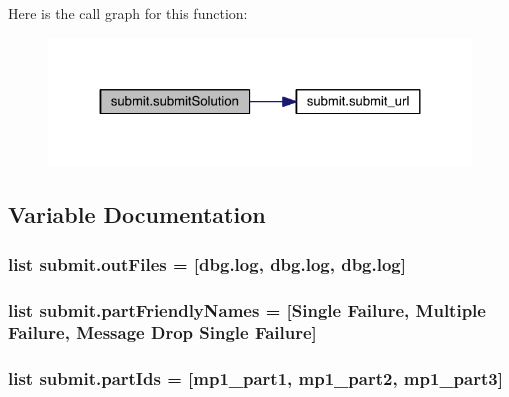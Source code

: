 Here is the call graph for this function\+:\nopagebreak
\begin{figure}[H]
\begin{center}
\leavevmode
\includegraphics[width=324pt]{df/d89/namespacesubmit_a60851498bd1a010849ce5eea631d5db4_cgraph}
\end{center}
\end{figure}




\subsection{Variable Documentation}
\hypertarget{namespacesubmit_a3786c6934dacbb2bfc06016782e0762a}{}
\subsubsection[{out\+Files}]{\setlength{\rightskip}{0pt plus 5cm}list submit.\+out\+Files = \mbox{[}\textquotesingle{}dbg.\+log\textquotesingle{}, \textquotesingle{}dbg.\+log\textquotesingle{}, \textquotesingle{}dbg.\+log\textquotesingle{}\mbox{]}}\label{namespacesubmit_a3786c6934dacbb2bfc06016782e0762a}
\hypertarget{namespacesubmit_aeb3f352aa22c52014fd7d466e68fd0c9}{}
\subsubsection[{part\+Friendly\+Names}]{\setlength{\rightskip}{0pt plus 5cm}list submit.\+part\+Friendly\+Names = \mbox{[}\textquotesingle{}Single Failure\textquotesingle{}, \textquotesingle{}Multiple Failure\textquotesingle{}, \textquotesingle{}Message Drop Single Failure\textquotesingle{}\mbox{]}}\label{namespacesubmit_aeb3f352aa22c52014fd7d466e68fd0c9}
\hypertarget{namespacesubmit_adcc18b8607b8217f0065424b10a8d0bb}{}
\subsubsection[{part\+Ids}]{\setlength{\rightskip}{0pt plus 5cm}list submit.\+part\+Ids = \mbox{[}\textquotesingle{}mp1\+\_\+part1\textquotesingle{}, \textquotesingle{}mp1\+\_\+part2\textquotesingle{}, \textquotesingle{}mp1\+\_\+part3\textquotesingle{}\mbox{]}}\label{namespacesubmit_adcc18b8607b8217f0065424b10a8d0bb}
\hypertarget{namespacesubmit_a479f856e3e67398d574766a49993a7ce}{}
